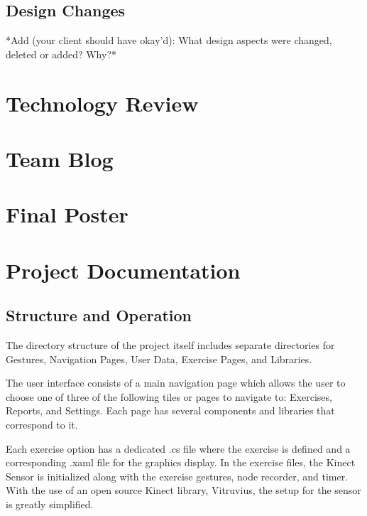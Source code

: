 \documentclass[onecolumn, draftclsnofoot,10pt, compsoc]{IEEEtran}
\begin{document}
\subsection{Design Changes}
*Add (your client should have okay'd): What design aspects were changed, deleted or added? Why?*

\section{Technology Review}


\section{Team Blog}

\section{Final Poster}
  
\section{Project Documentation}
\subsection{Structure and Operation}
The directory structure of the project itself includes separate directories for Gestures, Navigation Pages, User Data, Exercise Pages, and Libraries. 

The user interface consists of a main navigation page which allows the user to choose one of three of the following tiles or pages to navigate to: Exercises, Reports, and Settings. Each page has several components and libraries that correspond to it. 

Each exercise option has a dedicated .cs file where the exercise is defined and a corresponding .xaml file for the graphics display. In the exercise files, the Kinect Sensor is initialized along with the exercise gestures, node recorder, and timer. With the use of an open source Kinect library, Vitruvius, the setup for the sensor is greatly simplified. 
\end{document}
